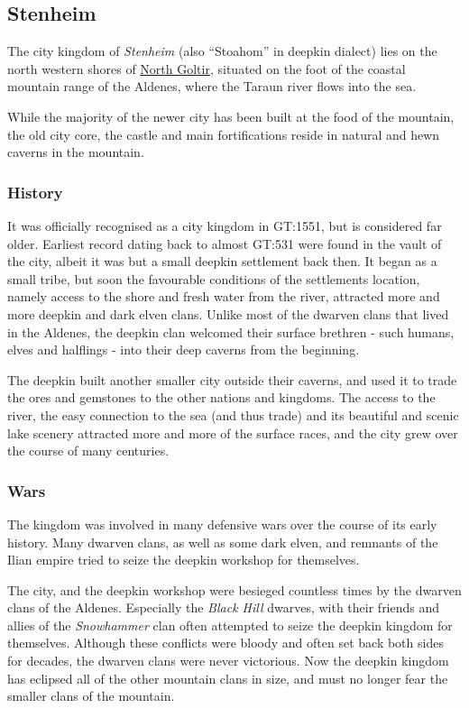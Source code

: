 \subsection{Stenheim}
\label{sec:Stenheim}

The city kingdom of \emph{Stenheim} (also ``Stoahom'' in deepkin dialect) lies
on the north western shores of \hyperref[sec:Goltir]{North Goltir}, situated
on the foot of the coastal mountain range of the Aldenes, where the Taraun
river flows into the sea.

While the majority of the newer city has been built at the food of the
mountain, the old city core, the castle and main fortifications reside in
natural and hewn caverns in the mountain.

\subsubsection{History}

It was officially recognised as a city kingdom in GT:1551, but is considered
far older. Earliest record dating back to almost GT:531 were found in the
vault of the city, albeit it was but a small deepkin settlement back then. It
began as a small tribe, but soon the favourable conditions of the settlements
location, namely access to the shore and fresh water from the river, attracted
more and more deepkin and dark elven clans. Unlike most of the dwarven clans
that lived in the Aldenes, the deepkin clan welcomed their surface brethren -
such humans, elves and halflings - into their deep caverns from the beginning.

The deepkin built another smaller city outside their caverns, and used it to
trade the ores and gemstones to the other nations and kingdoms. The access to
the river, the easy connection to the sea (and thus trade) and its beautiful
and scenic lake scenery attracted more and more of the surface races, and the
city grew over the course of many centuries.

\subsubsection{Wars}

The kingdom was involved in many defensive wars over the course of its early
history. Many dwarven clans, as well as some dark elven, and remnants of the
Ilian empire tried to seize the deepkin workshop for themselves.

The city, and the deepkin workshop were besieged countless times by the
dwarven clans of the Aldenes. Especially the \emph{Black Hill} dwarves, with
their friends and allies of the \emph{Snowhammer} clan often attempted to
seize the deepkin kingdom for themselves. Although these conflicts were bloody
and often set back both sides for decades, the dwarven clans were never
victorious. Now the deepkin kingdom has eclipsed all of the other mountain
clans in size, and must no longer fear the smaller clans of the mountain.

